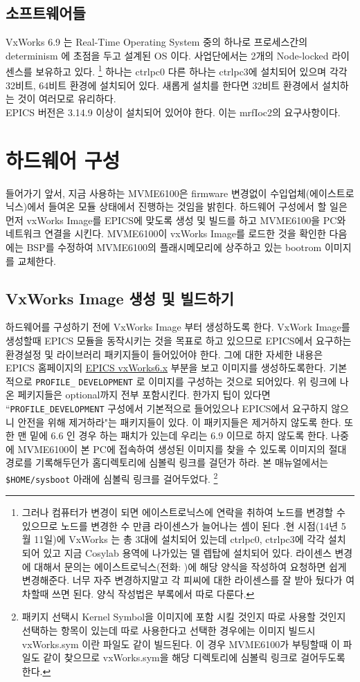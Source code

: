 \documentclass[11pt,a4paper]{article}
\begin{document}
\subsection{소프트웨어들}
VxWorks 6.9 는 Real-Time Operating System 중의 하나로 프로세스간의 determinism 에 초점을 두고 설계된 OS 이다.
사업단에서는 2개의 Node-locked 라이센스를 보유하고 있다.
\footnote{그러나 컴퓨터가 변경이 되면 에이스트로닉스에 연락을 취하여 노드를 변경할 수 있으므로 노드를 변경한 수 
만큼 라이센스가 늘어나는 셈이 된다 .현 시점(14년 5월 11일)에 VxWorks 는 총 3대에 설치되어 있는데 
ctrlpc0, ctrlpc3에 각각 설치되어 있고 지금 Cosylab 용역에 나가있는 델 렙탑에 설치되어 있다. 
라이센스 변경에 대해서 문의는 에이스트로닉스(전화: )에 해당 양식을 작성하여 요청하면
쉽게 변경해준다. 너무 자주 변경하지말고 각 피씨에 대한 라이센스를 잘 받아 뒀다가 여차할때 쓰면 된다.
양식 작성법은 부록에서 따로 다룬다.}
하나는 ctrlpc0 다른 하나는 ctrlpc3에 설치되어 있으며 각각 32비트, 64비트 환경에 설치되어 있다. 
새롭게 설치를 한다면 32비트 환경에서 설치하는 것이 여러모로 유리하다. \\

EPICS 버전은 3.14.9 이상이 설치되어 있어야 한다. 이는 mrfIoc2의 요구사항이다.

\section{하드웨어 구성}
들어가기 앞서, 지금 사용하는 MVME6100은 firmware 변경없이 수입업체(에이스트로닉스)에서 들여온 모듈 상태에서 진행하는 것임을 밝힌다.
하드웨어 구성에서 할 일은 먼저 vxWorks Image를 EPICS에 맞도록 생성 및 빌드를 하고 MVME6100을 PC와 네트워크 연결을 시킨다. 
MVME6100이 vxWorks Image를 로드한 것을 확인한 다음에는 BSP를 수정하여 MVME6100의 플래시메모리에 상주하고 있는 bootrom 이미지를 
교체한다.

\subsection{VxWorks Image 생성 및 빌드하기}
하드웨어를 구성하기 전에 VxWorks Image 부터 생성하도록 한다. VxWork Image를 생성할때 EPICS 모듈을 동작시키는 것을 
목표로 하고 있으므로 EPICS에서 요구하는 환경설정 및 라이브러리 패키지들이 들어있어야 한다. 그에 대한 자세한 내용은
EPICS 홈페이지의 \href{http://www.aps.anl.gov/epics/base/vxWorks6.php}{EPICS vxWorks6.x} 부분을 보고 이미지를 생성하도록한다.
기본적으로 \verb|PROFILE_| \verb|DEVELOPMENT| 로 이미지를 구성하는 것으로 되어있다. 위 링크에 나온 페키지들은 optional까지 전부 포함시킨다. 
한가지 팁이 있다면 ``\verb|PROFILE_DEVELOPMENT| 구성에서 기본적으로 들어있으나 EPICS에서 요구하지 않으니 안전을 위해 제거하라"는 패키지들이 있다. 이 패키지들은 제거하지 않도록 한다. 또한 맨 밑에 6.6 인 경우 하는 패치가 있는데 우리는 6.9 이므로 하지 않도록 한다.
나중에 MVME6100이 본 PC에 접속하여 생성된 이미지를 찾을 수 있도록 이미지의 절대 경로를 기록해두던가 홈디렉토리에 심볼릭 링크를 걸던가 하라. 본 매뉴얼에서는 \verb|$HOME/sysboot| 아래에 심볼릭 링크를 걸어두었다. \footnote{패키지 선택시 Kernel Symbol을 이미지에 포함 시킬 것인지 따로 사용할 것인지 선택하는 항목이 있는데 따로 사용한다고 선택한 경우에는 이미지 빌드시 vxWorks.sym 이란 파일도 같이 빌드된다. 이 경우 MVME6100가 부팅할때 이 파일도 같이 찾으므로 vxWorks.sym을 해당 디렉토리에 심볼릭 링크로 걸어두도록 한다.}
\end{document}
